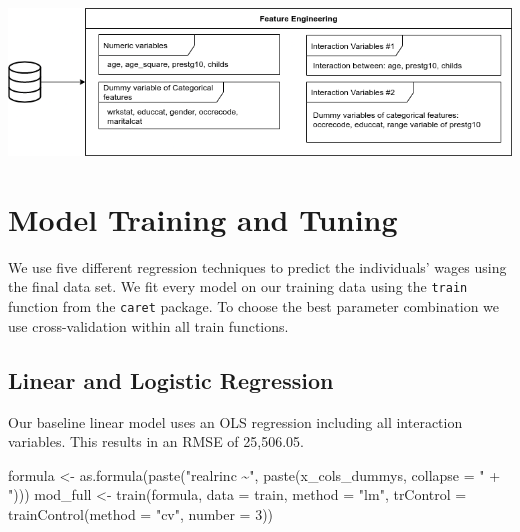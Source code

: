 \documentclass[11pt,a4paper]{article}
\let\origfigure\figure
\let\endorigfigure\endfigure
\renewenvironment{figure}[1][2] {
    \expandafter\origfigure\expandafter[H]
} {
    \endorigfigure
}
\newenvironment{Shaded}{\begin{snugshade}}{\end{snugshade}}
\newcommand{\AttributeTok}[1]{\textcolor[rgb]{0.77,0.63,0.00}{#1}}
\newcommand{\DecValTok}[1]{\textcolor[rgb]{0.00,0.00,0.81}{#1}}
\newcommand{\FunctionTok}[1]{\textcolor[rgb]{0.00,0.00,0.00}{#1}}
\newcommand{\NormalTok}[1]{#1}
\newcommand{\OtherTok}[1]{\textcolor[rgb]{0.56,0.35,0.01}{#1}}
\newcommand{\StringTok}[1]{\textcolor[rgb]{0.31,0.60,0.02}{#1}}
\begin{document}
\begin{figure}
\centering
\includegraphics{includes/feature_process.png}
\caption{Feature Engineering}
\end{figure}

\hypertarget{model-training-and-tuning}{%
\section{Model Training and Tuning}\label{model-training-and-tuning}}

We use five different regression techniques to predict the individuals'
wages using the final data set. We fit every model on our training data
using the \texttt{train} function from the \texttt{caret} package. To
choose the best parameter combination we use cross-validation within all
train functions.

\hypertarget{linear-and-logistic-regression}{%
\subsection{Linear and Logistic
Regression}\label{linear-and-logistic-regression}}

Our baseline linear model uses an OLS regression including all
interaction variables. This results in an RMSE of 25,506.05.

\begin{Shaded}
\begin{Highlighting}[]
\NormalTok{formula }\OtherTok{\textless{}{-}} \FunctionTok{as.formula}\NormalTok{(}\FunctionTok{paste}\NormalTok{(}\StringTok{"realrinc \textasciitilde{}"}\NormalTok{, }
                            \FunctionTok{paste}\NormalTok{(x\_cols\_dummys, }\AttributeTok{collapse =} \StringTok{" + "}\NormalTok{)))}
\NormalTok{mod\_full }\OtherTok{\textless{}{-}} \FunctionTok{train}\NormalTok{(formula,}
                  \AttributeTok{data =}\NormalTok{ train, }
                  \AttributeTok{method =} \StringTok{"lm"}\NormalTok{,  }
                  \AttributeTok{trControl =} \FunctionTok{trainControl}\NormalTok{(}\AttributeTok{method =} \StringTok{"cv"}\NormalTok{, }\AttributeTok{number =} \DecValTok{3}\NormalTok{))}
\end{Highlighting}
\end{Shaded}
\end{document}
